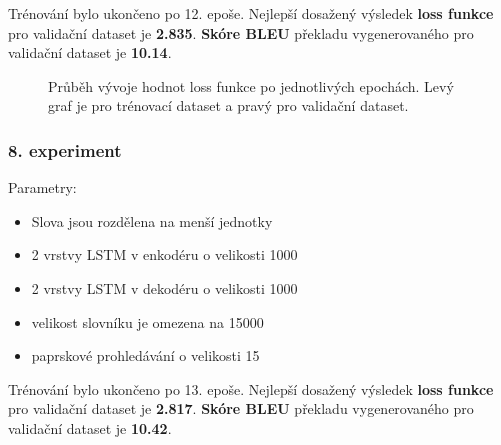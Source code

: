 Trénování bylo ukončeno po 12. epoše. Nejlepší dosažený výsledek \textbf{loss funkce} pro validační dataset je \textbf{2.835}. \textbf{Skóre BLEU} překladu vygenerovaného pro validační dataset je \textbf{10.14}.

\begin{figure}[H]
    \begin{center}
    \end{center}
	\caption{Průběh vývoje hodnot loss funkce po jednotlivých epochách. Levý graf je pro trénovací dataset a pravý pro validační dataset.}
\end{figure}


\subsubsection{8. experiment}\label{experiment8}
Parametry:
\begin{itemize}
  \item Slova jsou rozdělena na menší jednotky
  \item 2 vrstvy LSTM v enkodéru o velikosti 1000
  \item 2 vrstvy LSTM v dekodéru o velikosti 1000
  \item velikost slovníku je omezena na 15000
  \item paprskové prohledávání o velikosti 15
\end{itemize}

Trénování bylo ukončeno po 13. epoše. Nejlepší dosažený výsledek \textbf{loss funkce} pro validační dataset je \textbf{2.817}. \textbf{Skóre BLEU} překladu vygenerovaného pro validační dataset je \textbf{10.42}.

